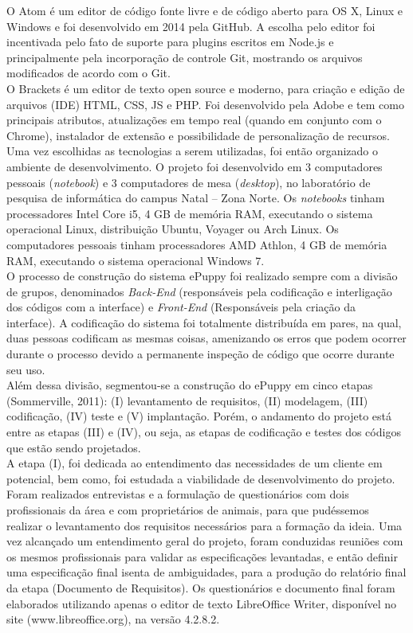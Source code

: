 O Atom é um editor de código fonte livre e de código aberto para OS X, Linux e Windows e foi desenvolvido em 2014 pela GitHub. A escolha pelo editor foi incentivada pelo fato de suporte para plugins escritos em Node.js e principalmente pela incorporação de controle Git, mostrando os arquivos modificados de acordo com o Git.
\\
\indent
O Brackets é um editor de texto open source e moderno, para criação e edição de arquivos (IDE) HTML, CSS, JS e PHP. Foi desenvolvido pela Adobe e tem como principais atributos, atualizações em tempo real (quando em conjunto com o Chrome), instalador de extensão e possibilidade de personalização de recursos.
\\
\indent
Uma vez escolhidas as tecnologias a serem utilizadas, foi então organizado o ambiente de desenvolvimento. O projeto foi desenvolvido em 3 computadores pessoais ({\it notebook}) e 3 computadores de mesa ({\it desktop}), no laboratório de pesquisa de informática do campus Natal – Zona Norte. Os {\it notebooks} tinham processadores Intel Core i5, 4 GB de memória RAM, executando o sistema operacional Linux, distribuição Ubuntu, Voyager ou Arch Linux. Os computadores pessoais tinham processadores AMD Athlon, 4 GB de memória RAM, executando o sistema operacional Windows 7.	
\\
\indent
O processo de construção do sistema ePuppy foi realizado sempre com a divisão de grupos, denominados {\it Back-End} (responsáveis pela codificação e interligação dos códigos com a interface) e {\it Front-End} (Responsáveis pela criação da interface). A codificação do sistema foi totalmente distribuída em pares, na qual, duas pessoas codificam as mesmas coisas, amenizando os erros que podem ocorrer durante o processo devido a permanente inspeção de código que ocorre durante seu uso.
\\
\indent
Além dessa divisão, segmentou-se a construção do ePuppy em cinco etapas (Sommerville, 2011): (I) levantamento de requisitos, (II) modelagem, (III) codificação, (IV) teste e (V) implantação. Porém, o andamento do projeto está entre as etapas (III) e (IV), ou seja, as etapas de codificação e testes dos códigos que estão sendo projetados.
\\
\indent
	A etapa (I), foi dedicada ao entendimento das necessidades de um cliente em potencial, bem como, foi estudada a viabilidade de desenvolvimento do projeto. Foram realizados entrevistas e a formulação de questionários com dois profissionais da área e com proprietários de animais, para que pudéssemos realizar o levantamento dos requisitos necessários para a formação da ideia. Uma vez alcançado um entendimento geral do projeto, foram conduzidas reuniões com os mesmos profissionais para validar as especificações levantadas, e então definir uma especificação final isenta de ambiguidades, para a produção do relatório final da etapa (Documento de Requisitos). Os questionários e documento final foram elaborados utilizando apenas o editor de texto LibreOffice Writer, disponível no site (www.libreoffice.org), na versão 4.2.8.2.

